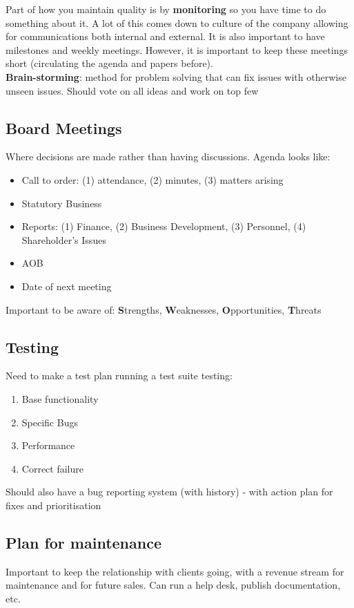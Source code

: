\documentclass{article}
\begin{document}
\begin{multicols}{2}
Part of how you maintain quality is by \textbf{monitoring} so you have time to do something about it. A lot of this comes down to culture of the company allowing for communications both internal and external. It is also important to have milestones and weekly meetings. However, it is important to keep these meetings short (circulating the agenda and papers before).\\

\textbf{Brain-storming}: method for problem solving that can fix issues with otherwise unseen issues. Should vote on all ideas and work on top few

\subsection{Board Meetings}
Where decisions are made rather than having discussions. Agenda looks like:
\begin{itemize}
    \item Call to order: (1) attendance, (2) minutes, (3) matters arising
    \item Statutory Business
    \item Reports: (1) Finance, (2) Business Development, (3) Personnel, (4) Shareholder's Issues
    \item AOB
    \item Date of next meeting
\end{itemize}


Important to be aware of: \textbf{S}trengths, \textbf{W}eaknesses, \textbf{O}pportunities, \textbf{T}hreats

\subsection{Testing}
Need to make a test plan running a test suite testing:
\begin{enumerate}
    \item Base functionality
    \item Specific Bugs
    \item Performance
    \item Correct failure
\end{enumerate}

Should also have a bug reporting system (with history) - with action plan for fixes and prioritisation
\subsection{Plan for maintenance}
Important to keep the relationship with clients going, with a revenue stream for maintenance and for future sales. Can run a help desk, publish documentation, etc.


\end{multicols}
\end{document}
